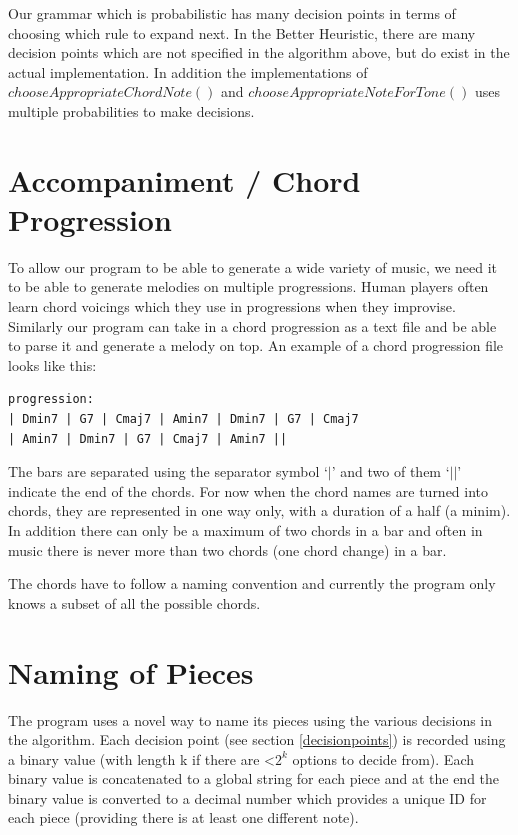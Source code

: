 \documentclass[pdftex,12pt,a4paper]{report}
\begin{document}
Our grammar which is probabilistic has many decision points in terms of choosing which rule to expand next. In the Better Heuristic, there are many decision points which are not specified in the algorithm above, but do exist in the actual implementation. In addition the implementations of $chooseAppropriateChordNote()$ and $chooseAppropriateNoteForTone()$ uses multiple probabilities to make decisions.


\section{Accompaniment / Chord Progression}
To allow our program to be able to generate a wide variety of music, we need it to be able to generate melodies on multiple progressions. Human players often learn chord voicings which they use in progressions when they improvise. Similarly our program can take in a chord progression as a text file and be able to parse it and generate a melody on top. An example of a chord progression file looks like this:

\begin{verbatim}
progression:
| Dmin7 | G7 | Cmaj7 | Amin7 | Dmin7 | G7 | Cmaj7  
| Amin7 | Dmin7 | G7 | Cmaj7 | Amin7 || 
\end{verbatim}

The bars are separated using the separator symbol `$|$' and two of them `$||$' indicate the end of the chords. For now when the chord names are turned into chords, they are represented in one way only, with a duration of a half (a minim). In addition there can only be a maximum of two chords in a bar and often in music there is never more than two chords (one chord change) in a bar.

The chords have to follow a naming convention and currently the program only knows a subset of all the possible chords. 

\section{Naming of Pieces} \label{naming}
The program uses a novel way to name its pieces using the various decisions in the algorithm. Each decision point (see section \ref{decisionpoints}) is recorded using a binary value (with length k if there are \textless $2^{k}$  options to decide from). Each binary value is concatenated to a global string for each piece and at the end the binary value is converted to a decimal number which provides a unique ID for each piece (providing there is at least one different note). 
\end{document}
